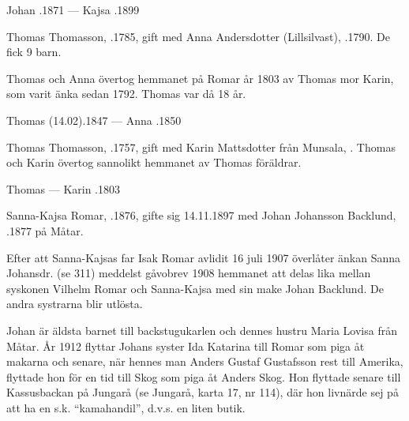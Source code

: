 Johan .1871  ---  Kajsa .1899


Thomas Thomasson, .1785, gift med Anna Andersdotter (Lillsilvast), .1790. De fick 9 barn.
\begin{jhchildren}
  \item {}
  \item {}
\end{jhchildren}
Thomas och Anna övertog hemmanet på Romar år 1803 av Thomas mor Karin, som varit änka sedan 1792. Thomas var då 18 år.

Thomas (14.02).1847  ---  Anna .1850


Thomas Thomasson, .1757, gift med Karin Mattsdotter från Munsala, . Thomas och Karin övertog sannolikt hemmanet av Thomas föräldrar.
\begin{jhchildren}
  \item {}
  \item {}
\end{jhchildren}

Thomas   ---  Karin .1803






Sanna-Kajsa Romar, .1876, gifte sig 14.11.1897 med Johan Johansson Backlund, .1877 på Måtar.

Efter att Sanna-Kajsas far Isak Romar avlidit 16 juli 1907 överlåter änkan Sanna Johansdr. (se 311) meddelst gåvobrev 1908 hemmanet att delas lika mellan syskonen Vilhelm Romar och Sanna-Kajsa med sin make Johan Backlund. De andra systrarna blir utlösta.

Johan är äldsta barnet till backstugukarlen  och dennes hustru Maria Lovisa från Måtar. År 1912 flyttar Johans syster Ida Katarina till Romar som piga åt makarna och senare, när hennes man Anders Gustaf Gustafsson rest till Amerika, flyttade hon för en tid till Skog som piga åt Anders Skog. Hon flyttade senare till Kassusbackan på Jungarå (se Jungarå, karta 17, nr 114), där hon livnärde sej på att ha en s.k. ``kamahandil'', d.v.s. en liten butik.

